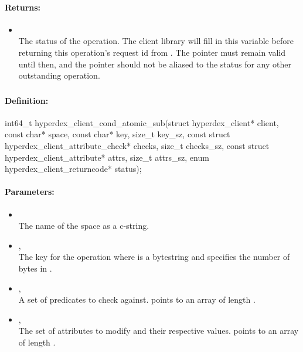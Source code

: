 \paragraph{Returns:}
\begin{itemize}[noitemsep]
\item {}\\
The status of the operation.  The client library will fill in this variable before returning this operation's request id from .  The pointer must remain valid until then, and the pointer should not be aliased to the status for any other outstanding operation.
\end{itemize}

\pagebreak
\subsubsection{}
\label{api:c:cond_atomic_sub}


\paragraph{Definition:}
\begin{ccode}
int64_t hyperdex_client_cond_atomic_sub(struct hyperdex_client* client,
        const char* space,
        const char* key, size_t key_sz,
        const struct hyperdex_client_attribute_check* checks, size_t checks_sz,
        const struct hyperdex_client_attribute* attrs, size_t attrs_sz,
        enum hyperdex_client_returncode* status);
\end{ccode}

\paragraph{Parameters:}
\begin{itemize}[noitemsep]
\item {}\\
The name of the space as a c-string.
\item {}, \\
The key for the operation where  is a bytestring and  specifies the number of bytes in .
\item {}, \\
A set of predicates to check against.   points to an array of length .
\item {}, \\
The set of attributes to modify and their respective values.   points to an array of length .
\end{itemize}

